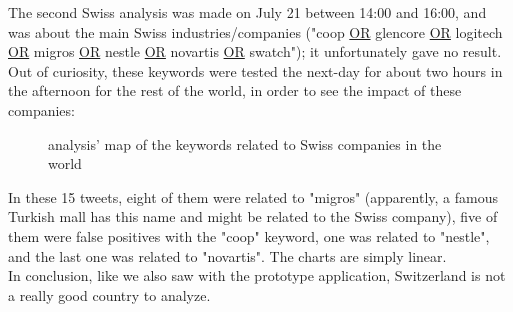 \documentclass[a4paper,11pt]{report}
\begin{document}
The second Swiss analysis was made on July 21 between 14:00 and 16:00, and was about the main Swiss industries/companies ("coop \underline{OR} glencore \underline{OR} logitech \underline{OR} migros \underline{OR} nestle \underline{OR} novartis \underline{OR} swatch"); it unfortunately gave no result. Out of curiosity, these keywords were tested the next-day for about two hours in the afternoon for the rest of the world, in order to see the impact of these companies:
\begin{figure}[H]
\vspace{-5pt}
\begin{center}
\vspace{-20pt}
\caption{analysis' map of the keywords related to Swiss companies in the world}
\end{center}
\end{figure}
\vspace{-10pt}
In these 15 tweets, eight of them were related to "migros" (apparently, a famous Turkish mall has this name and might be related to the Swiss company), five of them were false positives with the "coop" keyword, one was related to "nestle", and the last one was related to "novartis". The charts are simply linear.\\

In conclusion, like we also saw with the prototype application, Switzerland is not a really good country to analyze.
\end{document}
